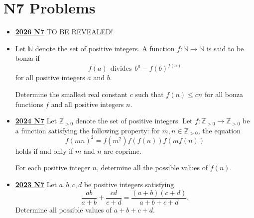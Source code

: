 \documentclass[11pt]{scrartcl}
\begin{document}
\section*{N7 Problems}  \label{N7}
\begin{itemize}[leftmargin=*]


\item \href{https://www.imo-official.org/assets/documents/problems/2026/IMO2026SL.pdf}{\textbf{2026 N7}} TO BE REVEALED!

\item {} Let $\mathbb{N}$ denote the set of positive integers. A function $f\colon\mathbb{N}\to\mathbb{N}$ is said to be bonza if
\[
f(a)~~\text{divides}~~b^a-f(b)^{f(a)}
\]for all positive integers $a$ and $b$.

Determine the smallest real constant $c$ such that $f(n)\leqslant cn$ for all bonza functions $f$ and all positive integers $n$.
\item \href{https://artofproblemsolving.com/community/c6h3610443p35340914}{\textbf{2024 N7}} Let $\mathbb{Z}_{>0}$ denote the set of positive integers. Let $f : \mathbb{Z}_{>0} \rightarrow \mathbb{Z}_{>0}$ be a function satisfying the following property: for $m,n \in \mathbb{Z}_{>0}$, the equation
\[
f(mn)^2 = f(m^2)f(f(n))f(mf(n))
\]holds if and only if $m$ and $n$ are coprime.

For each positive integer $n$, determine all the possible values of $f(n)$.	

\item \href{https://artofproblemsolving.com/community/c6h3359727p31218380}{\textbf{2023 N7}} Let $a,b,c,d$ be positive integers satisfying\[\frac{ab}{a+b}+\frac{cd}{c+d}=\frac{(a+b)(c+d)}{a+b+c+d}.\]Determine all possible values of $a+b+c+d$.	


\end{itemize}
\end{document}
